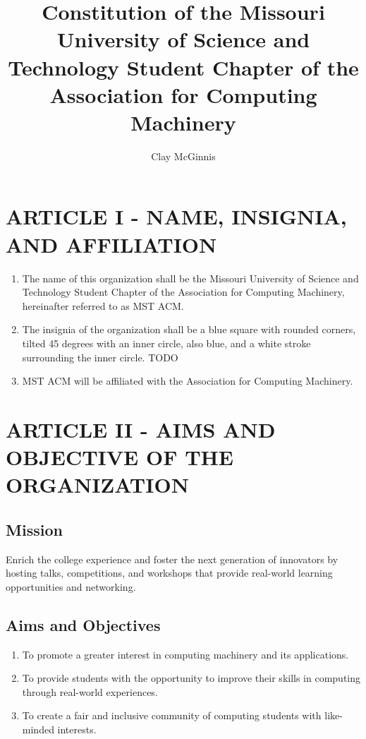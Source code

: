 \documentclass[11pt,a4paper,notitlepage]{article}
\author{Clay McGinnis}
\title{Constitution of the Missouri University of Science and Technology Student Chapter of the Association for Computing Machinery}
\begin{document}
\maketitle



\section*{ARTICLE I - NAME, INSIGNIA, AND AFFILIATION}
\begin{enumerate}[label=\Alph*.]
  \item The name of this organization shall be the Missouri University of
  Science and Technology Student Chapter of the Association for Computing
  Machinery, hereinafter referred to as MST ACM.
  \item The insignia of the organization shall be a blue square with rounded
    corners, tilted 45 degrees with an inner circle, also blue, and a white
    stroke surrounding the inner circle. TODO
  \item MST ACM will be affiliated with the Association for Computing Machinery.
\end{enumerate}


\section*{ARTICLE II - AIMS AND OBJECTIVE OF THE ORGANIZATION}
\subsection{Mission}
Enrich the college experience and foster the next generation of innovators by
hosting talks, competitions, and workshops that provide real-world learning
opportunities and networking.
\subsection{Aims and Objectives}
    \begin{enumerate}[label=\arabic*.]
      \item To promote a greater interest in computing machinery and its
      applications.
      \item To provide students with the opportunity to improve their skills in
      computing through real-world experiences.
      \item To create a fair and inclusive community of computing students with
      like-minded interests.
    \end{enumerate}
\end{document}
